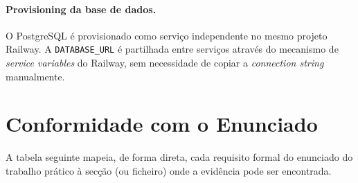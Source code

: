 \documentclass[11pt,a4paper]{article}
\begin{document}
\paragraph{Provisioning da base de dados.}
O PostgreSQL é provisionado como serviço independente no mesmo projeto
Railway. A \texttt{DATABASE\_URL} é partilhada entre serviços através do
mecanismo de \emph{service variables} do Railway, sem necessidade de copiar
a \emph{connection string} manualmente.

\section{Conformidade com o Enunciado}

A tabela seguinte mapeia, de forma direta, cada requisito formal do enunciado
do trabalho prático à secção (ou ficheiro) onde a evidência pode ser
encontrada.
\end{document}
